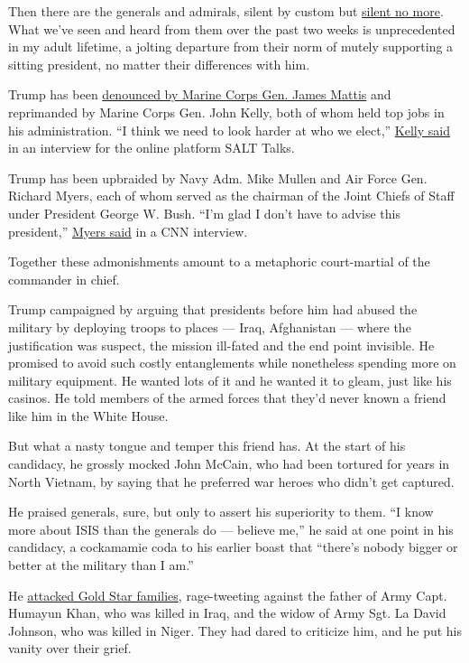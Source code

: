 Then there are the generals and admirals, silent by custom but
\href{https://www.cnn.com/2020/06/05/politics/military-leaders-trump-floyd-protests/index.html}{silent
no more}. What we've seen and heard from them over the past two weeks is
unprecedented in my adult lifetime, a jolting departure from their norm
of mutely supporting a sitting president, no matter their differences
with him.

Trump has been
\href{https://www.theatlantic.com/politics/archive/2020/06/james-mattis-denounces-trump-protests-militarization/612640/}{denounced
by Marine Corps Gen. James Mattis} and reprimanded by Marine Corps Gen.
John Kelly, both of whom held top jobs in his administration. ``I think
we need to look harder at who we elect,''
\href{https://www.youtube.com/watch?v=_zAu3cZdQVQ}{Kelly said} in an
interview for the online platform SALT Talks.

Trump has been upbraided by Navy Adm. Mike Mullen and Air Force Gen.
Richard Myers, each of whom served as the chairman of the Joint Chiefs
of Staff under President George W. Bush. ``I'm glad I don't have to
advise this president,''
\href{https://www.cnn.com/2020/06/04/politics/trump-protests-former-joint-chiefs-chairman-cnntv/index.html}{Myers
said} in a CNN interview.

Together these admonishments amount to a metaphoric court-martial of the
commander in chief.

Trump campaigned by arguing that presidents before him had abused the
military by deploying troops to places --- Iraq, Afghanistan --- where
the justification was suspect, the mission ill-fated and the end point
invisible. He promised to avoid such costly entanglements while
nonetheless spending more on military equipment. He wanted lots of it
and he wanted it to gleam, just like his casinos. He told members of the
armed forces that they'd never known a friend like him in the White
House.

But what a nasty tongue and temper this friend has. At the start of his
candidacy, he grossly mocked John McCain, who had been tortured for
years in North Vietnam, by saying that he preferred war heroes who
didn't get captured.

He praised generals, sure, but only to assert his superiority to them.
``I know more about ISIS than the generals do --- believe me,'' he said
at one point in his candidacy, a cockamamie coda to his earlier boast
that ``there's nobody bigger or better at the military than I am.''

He
\href{https://www.npr.org/2017/10/23/559558075/trump-call-controversy-renews-spotlight-on-gold-star-families}{attacked
Gold Star families}, rage-tweeting against the father of Army Capt.
Humayun Khan, who was killed in Iraq, and the widow of Army Sgt. La
David Johnson, who was killed in Niger. They had dared to criticize him,
and he put his vanity over their grief.

